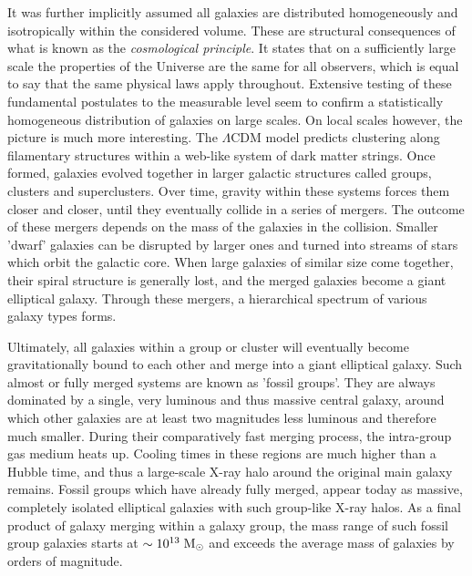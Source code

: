It was further implicitly assumed all galaxies are distributed homogeneously and
isotropically within the considered volume.  These are structural consequences
of what is known as the \textit{cosmological principle}.  It states that on a
sufficiently large scale the properties of the Universe are the same for all
observers, which is equal to say that the same physical laws apply throughout.
Extensive testing of these fundamental postulates to the measurable level seem
to confirm a statistically homogeneous
distribution of galaxies on large scales.  On local scales however, the picture
is much more interesting.  The $\Lambda$CDM model predicts clustering along
filamentary structures within a web-like system of dark matter strings.  Once
formed, galaxies evolved together in larger galactic structures called groups,
clusters and superclusters.  Over time, gravity within these systems forces them
closer and closer, until they eventually collide in a series of mergers. The
outcome of these mergers depends on the mass of the galaxies in the collision.
Smaller 'dwarf' galaxies can be disrupted by larger ones and turned into streams
of stars which orbit the galactic core.  When large galaxies of similar size
come together, their spiral structure is generally lost, and the merged galaxies
become a giant elliptical galaxy.  Through these mergers, a hierarchical
spectrum of various galaxy types forms.

Ultimately, all galaxies within a group or cluster will eventually become
gravitationally bound to each other and merge into a giant elliptical galaxy.
Such almost or fully merged systems are known as 'fossil groups'. They are
always dominated by a single, very luminous and thus massive central galaxy,
around which other galaxies are at least two magnitudes less luminous and
therefore much smaller.  During their comparatively fast merging process, the
intra-group gas medium heats up.  Cooling times in these regions are much higher
than a Hubble time, and thus a large-scale X-ray halo around the original main
galaxy remains.  Fossil groups which have already fully merged, appear today as
massive, completely isolated elliptical galaxies with such group-like X-ray
halos.  As a final product of galaxy merging within a galaxy group, the mass
range of such fossil group galaxies starts at $\sim10^{13}\;\mathrm{M_{\odot}}$ and exceeds
the average mass of galaxies by orders of magnitude.  

